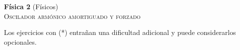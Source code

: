 \documentclass[11pt,spanish,a4paper]{article}
\begin{document}
\begin{center}
\textbf{Física 2} (Físicos) \hfill {}\\
\textsc{\LARGE Oscilador armónico amortiguado y forzado}\\
\end{center}

Los ejercicios con (*) entrañan una dificultad adicional y puede considerarlos opcionales.


\begin{enumerate}







\end{enumerate}
\end{document}

